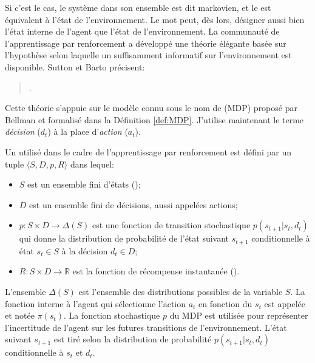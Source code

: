 
Si c'est le cas, le système dans son ensemble est dit markovien, et le  est équivalent à l'état de l'environnement. 
Le mot  peut, dès lors, désigner aussi bien l'état interne de l'agent que l'état de l'environnement. 
La communauté de l'apprentissage par renforcement a développé une théorie élégante basée sur l'hypothèse selon laquelle un  suffisamment informatif sur l'environnement est disponible. Sutton et Barto précisent: 

\begin{quote}
\cite[p.~63]{sutton_reinforcement_2018}.
\end{quote}


Cette théorie s'appuie sur le modèle connu sous le nom de  (MDP) proposé par Bellman et formalisé dans la Définition \ref{def:MDP}.
J'utilise maintenant le terme \emph{décision} ($d_t$) à la place d'\emph{action} ($a_t$). 

\begin{De}[MDP]
\label{def:MDP}
Un  utilisé dans le cadre de l'apprentissage par renforcement est défini par un tuple $\langle S, D, p, R \rangle$ dans lequel:
\begin{itemize}[label=\scalebox{.85}{$\diamond$}]
	\item $S$ est un ensemble fini d'états ();
	\item $D$ est un ensemble fini de décisions, aussi appelées actions;
	\item $p:S\times D\rightarrow\Delta(S)$ est une fonction de transition stochastique $p(s_{t+1}|s_t,d_t)$ qui donne la distribution de probabilité de l'état suivant $s_{t+1}$ conditionnelle à état $s_t\in S$ à la décision $d_t\in D$;
	\item $R:S\times D\rightarrow \mathbb{R}$ est la fonction de récompense instantanée ().
\end{itemize}
\end{De}

L'ensemble $\Delta(S)$ est l'ensemble des distributions possibles de la variable $S$.
La fonction interne à l'agent qui sélectionne l'action $a_t$ en fonction du  $s_t$ est appelée  et notée $\pi(s_t)$.
La fonction stochastique $p$ du MDP est utilisée pour représenter l'incertitude de l'agent sur les futures transitions de l'environnement.
L'état suivant $s_{t+1}$ est tiré selon la distribution de probabilité $p(s_{t+1}|s_t,d_t)$ conditionnelle à $s_t$ et $d_t$.

